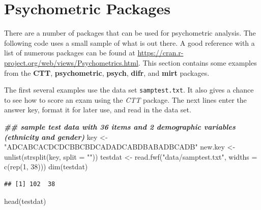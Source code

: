 \documentclass[
]{book}
\newenvironment{Shaded}{\begin{snugshade}}{\end{snugshade}}
\newcommand{\AttributeTok}[1]{\textcolor[rgb]{0.77,0.63,0.00}{#1}}
\newcommand{\DecValTok}[1]{\textcolor[rgb]{0.00,0.00,0.81}{#1}}
\newcommand{\DocumentationTok}[1]{\textcolor[rgb]{0.56,0.35,0.01}{\textbf{\textit{#1}}}}
\newcommand{\FunctionTok}[1]{\textcolor[rgb]{0.00,0.00,0.00}{#1}}
\newcommand{\NormalTok}[1]{#1}
\newcommand{\OtherTok}[1]{\textcolor[rgb]{0.56,0.35,0.01}{#1}}
\newcommand{\StringTok}[1]{\textcolor[rgb]{0.31,0.60,0.02}{#1}}
\begin{document}
\hypertarget{psychometric-packages}{%
\chapter{Psychometric Packages}\label{psychometric-packages}}

There are a number of packages that can be used for psychometric analysis. The following code uses a small sample of what is out there. A good reference with a list of numerous packages can be found at \url{https://cran.r-project.org/web/views/Psychometrics.html}. This section contains some examples from the \textbf{CTT}, \textbf{psychometric}, \textbf{psych}, \textbf{difr}, and \textbf{mirt} packages.

The first several examples use the data set \texttt{samptest.txt}. It also gives a chance to see how to score an exam using the \emph{CTT} package. The next lines enter the answer key, format it for later use, and read in the data set.

\begin{Shaded}
\begin{Highlighting}[]
\DocumentationTok{\#\# sample test data with 36 items and 2 demographic variables (ethnicity and gender)}
\NormalTok{key }\OtherTok{\textless{}{-}} \StringTok{"ADCABCACDCDCBBCBDCADADCABDBABADBCADB"}
\NormalTok{new.key }\OtherTok{\textless{}{-}} \FunctionTok{unlist}\NormalTok{(}\FunctionTok{strsplit}\NormalTok{(key, }\AttributeTok{split =} \StringTok{""}\NormalTok{))}
\NormalTok{testdat }\OtherTok{\textless{}{-}} \FunctionTok{read.fwf}\NormalTok{(}\StringTok{"data/samptest.txt"}\NormalTok{, }\AttributeTok{widths =} \FunctionTok{c}\NormalTok{(}\FunctionTok{rep}\NormalTok{(}\DecValTok{1}\NormalTok{, }\DecValTok{38}\NormalTok{)))}
\FunctionTok{dim}\NormalTok{(testdat)}
\end{Highlighting}
\end{Shaded}

\begin{verbatim}
## [1] 102  38
\end{verbatim}

\begin{Shaded}
\begin{Highlighting}[]
\FunctionTok{head}\NormalTok{(testdat)}
\end{Highlighting}
\end{Shaded}
\end{document}
